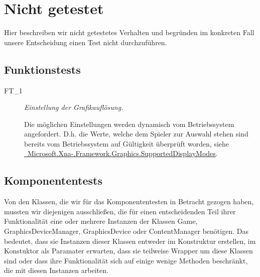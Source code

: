 %



\newpage



\section{Nicht getestet}
\label{Abschnitt:Tests:Nicht}

Hier beschreiben wir nicht getestetes Verhalten und begründen im konkreten Fall unsere Entscheidung einen Test nicht durchzuführen.
~\\




\subsection*{Funktionstests}
\label{Abschnitt:Tests:Nicht:Funktion}

\begin{description}

	\item[FT\_1] \textit{Einstellung der Grafikauflösung.} \hfill\\
	
	\label{FT:1}
	
	Die möglichen Einstellungen werden dynamisch vom Betriebssystem angefordert. D.h. die Werte, welche dem Spieler zur Auswahl stehen sind bereits vom Betriebssystem auf Gültigkeit überprüft worden, siehe  \href{http://msdn.microsoft.com/de-de/library/microsoft.xna.framework.graphics.graphicsadapter.supporteddisplaymodes}{\mousecursor~Microsoft.Xna-.Framework.Graphics.SupportedDisplayModes}.
	~\\
	
\end{description}




\subsection*{Komponententests}
\label{Abschnitt:Tests:Nicht:Komponenten}

Von den Klassen, die wir für das Komponententesten in Betracht gezogen haben, mussten wir diejenigen ausschließen, die für einen entscheidenden Teil ihrer Funktionalität eine oder mehrere Instanzen der Klassen Game, GraphicsDeviceManager, GraphicsDevice oder ContentManager benötigen. Das bedeutet, dass sie Instanzen dieser Klassen entweder im Konstruktur erstellen, im Konstuktor als Paramater erwarten, dass sie teilweise Wrapper um diese Klassen sind oder dass ihre Funktionalität sich auf einige wenige Methoden beschränkt, die mit diesen Instanzen arbeiten.

